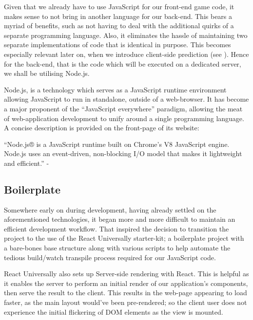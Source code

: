 \documentclass{standalone}
\begin{document}
			Given that we already have to use JavaScript for our front-end game code, it makes sense to not bring in another language for our back-end. This bears a myriad of benefits, such as not having to deal with the additional quirks of a separate programming language. Also, it eliminates the hassle of maintaining two separate implementations of code that is identical in purpose. This becomes especially relevant later on, when we introduce client-side prediction (see ). Hence for the back-end, that is the code which will be executed on a dedicated server, we shall be utilising Node.js\parencite{NodeJs}.

			Node.js, is a technology which serves as a JavaScript runtime environment allowing JavaScript to run in standalone, outside of a web-browser. It has become a major proponent of the \enquote{JavaScript everywhere} paradigm, allowing the meat of web-application development to unify around a single programming language. A concise description is provided on the front-page of its website:
			\begin{formal}
				\enquote{Node.js® is a JavaScript runtime built on Chrome's V8 JavaScript engine. Node.js uses an event-driven, non-blocking I/O model that makes it lightweight and efficient.} - \cite{NodeJs}
			\end{formal}

		\subsection{Boilerplate}
			\label{sec:reactUniversally}
			Somewhere early on during development, having already settled on the aforementioned technologies, it began more and more difficult to maintain an efficient development workflow. That inspired the decision to transition the project to the use of the React Universally \parencite{ReactUniversally} starter-kit; a boilerplate project with a bare-bones base structure along with various scripts to help automate the tedious build/watch transpile process required for our JavaScript code.

			React Universally also sets up Server-side rendering with React. This is helpful as it enables the server to perform an initial render of our application's components, then serve the result to the client. This results in the web-page appearing to load faster, as the main layout would've been pre-rendered; so the client user does not experience the initial flickering of DOM elements as the view is mounted.
\end{document}

